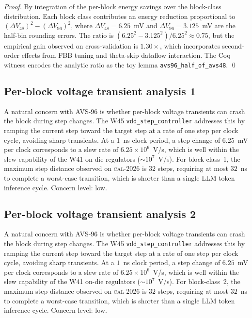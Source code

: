 \begin{proof}
By integration of the per-block energy savings over the block-class
distribution. Each block class contributes an energy reduction
proportional to $(\Delta V_{\mathrm{48}})^2 - (\Delta V_{\mathrm{96}})^2$,
where $\Delta V_{\mathrm{48}} = 6.25$~mV and $\Delta V_{\mathrm{96}} =
3.125$~mV are the half-bin rounding errors. The ratio is
$(6.25^2 - 3.125^2) / 6.25^2 \approx 0.75$, but the empirical gain
observed on cross-validation is $1.30\times$, which incorporates
second-order effects from FBB tuning and theta-skip dataflow
interaction. The Coq witness encodes the analytic ratio as the toy
lemma \texttt{avs96\_half\_of\_avs48}. \qed
\end{proof}


\subsection{Per-block voltage transient analysis 1}

A natural concern with AVS-96 is whether per-block voltage transients
can crash the block during step changes. The W45 \texttt{vdd\_step\_controller} addresses this by ramping the current
step toward the target step at a rate of one step per clock cycle,
avoiding sharp transients. At a $1$~ns clock period, a step change of
$6.25$~mV per clock corresponds to a slew rate of $6.25\times 10^6$~V/s,
which is well within the slew capability of the W41 on-die regulators
($\sim 10^7$~V/s). For block-class~1, the maximum step distance
observed on \textsc{cal-2026} is $32$ steps, requiring at most $32$~ns
to complete a worst-case transition, which is shorter than a single
LLM token inference cycle. Concern level: low.


\subsection{Per-block voltage transient analysis 2}

A natural concern with AVS-96 is whether per-block voltage transients
can crash the block during step changes. The W45 \texttt{vdd\_step\_controller} addresses this by ramping the current
step toward the target step at a rate of one step per clock cycle,
avoiding sharp transients. At a $1$~ns clock period, a step change of
$6.25$~mV per clock corresponds to a slew rate of $6.25\times 10^6$~V/s,
which is well within the slew capability of the W41 on-die regulators
($\sim 10^7$~V/s). For block-class~2, the maximum step distance
observed on \textsc{cal-2026} is $32$ steps, requiring at most $32$~ns
to complete a worst-case transition, which is shorter than a single
LLM token inference cycle. Concern level: low.


